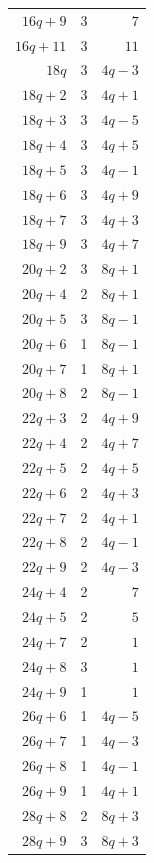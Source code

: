 \begin{longtable}{rrr}
$16q+9$ & 3 & $7$\\
$16q+11$ & 3 & $11$\\
$18q$ & 3 & $4q-3$\\
$18q+2$ & 3 & $4q+1$\\
$18q+3$ & 3 & $4q-5$\\
$18q+4$ & 3 & $4q+5$\\
$18q+5$ & 3 & $4q-1$\\
$18q+6$ & 3 & $4q+9$\\
$18q+7$ & 3 & $4q+3$\\
$18q+9$ & 3 & $4q+7$\\
$20q+2$ & 3 & $8q+1$\\
$20q+4$ & 2 & $8q+1$\\
$20q+5$ & 3 & $8q-1$\\
$20q+6$ & 1 & $8q-1$\\
$20q+7$ & 1 & $8q+1$\\
$20q+8$ & 2 & $8q-1$\\
$22q+3$ & 2 & $4q+9$\\
$22q+4$ & 2 & $4q+7$\\
$22q+5$ & 2 & $4q+5$\\
$22q+6$ & 2 & $4q+3$\\
$22q+7$ & 2 & $4q+1$\\
$22q+8$ & 2 & $4q-1$\\
$22q+9$ & 2 & $4q-3$\\
$24q+4$ & 2 & $7$\\
$24q+5$ & 2 & $5$\\
$24q+7$ & 2 & $1$\\
$24q+8$ & 3 & $1$\\
$24q+9$ & 1 & $1$\\
$26q+6$ & 1 & $4q-5$\\
$26q+7$ & 1 & $4q-3$\\
$26q+8$ & 1 & $4q-1$\\
$26q+9$ & 1 & $4q+1$\\
$28q+8$ & 2 & $8q+3$\\
$28q+9$ & 3 & $8q+3$\\
\end{longtable}
\endgroup

